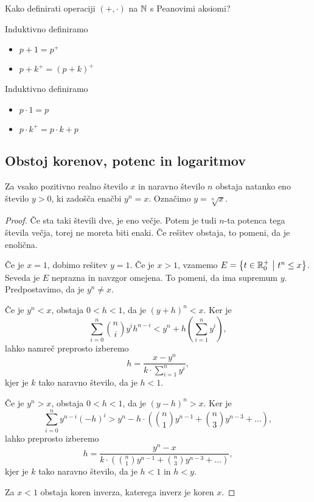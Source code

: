 \documentclass[12pt, a4paper]{article}
\begin{document}
\begin{opomba}
Kako definirati operaciji $(+,\cdot)$ na $\mathbb{N}$ s Peanovimi aksiomi?

\begin{description}[align=right, labelwidth=3cm]
\item[Operacija $+$:] Induktivno definiramo

\begin{itemize}
\item $p+1=p^+$
\item $p+k^+=(p+k)^+$
\end{itemize}

\item[Operacija $\cdot$:] Induktivno definiramo

\begin{itemize}
\item $p\cdot 1=p$
\item $p\cdot k^+=p\cdot k+p$
\end{itemize}
\end{description}
\end{opomba}

\newpage

\subsection{Obstoj korenov, potenc in logaritmov}

\begin{izrek}
Za vsako pozitivno realno število $x$ in naravno število $n$ obstaja natanko eno število $y>0$, ki zadošča enačbi $y^n=x$. Označimo $y=\sqrt[n]{x}$.
\end{izrek}

\begin{proof}
Če sta taki števili dve, je eno večje. Potem je tudi $n$-ta potenca tega števila večja, torej ne moreta biti enaki. Če rešitev obstaja, to pomeni, da je enolična.

Če je $x=1$, dobimo rešitev $y=1$. Če je $x>1$, vzamemo $E=\left\{t\in\mathbb{R}_0^+~\middle\vert~t^n\leq x\right\}$. Seveda je $E$ neprazna in navzgor omejena. To pomeni, da ima supremum $y$. Predpostavimo, da je $y^n\ne x$.

Če je $y^n<x$, obstaja $0<h<1$, da je $(y+h)^n<x$. Ker je
\[
\sum_{i=0}^n\binom{n}{i}y^ih^{n-i}< y^n+h\left(\sum_{i=1}^ny^i\right),
\]
lahko namreč preprosto izberemo
\[
h=\frac{x-y^n}{k\cdot \sum_{i=1}^ny^i},\]
kjer je $k$ tako naravno število, da je $h<1$.

Če je $y^n>x$, obstaja $0<h<1$, da je $(y-h)^n>x$. Ker je
\[
\sum_{i=0}^ny^{n-i}(-h)^i>y^n-h\cdot\left(\binom{n}{1}y^{n-1}+\binom{n}{3}y^{n-3}+\dots\right),
\]
lahko preprosto izberemo
\[
h=\frac{y^n-x}{k\cdot\left(\binom{n}{1}y^{n-1}+\binom{n}{3}y^{n-3}+\dots\right)},
\]
kjer je $k$ tako naravno število, da je $h<1$ in $h<y$.

Za $x<1$ obstaja koren inverza, katerega inverz je koren $x$.
\end{proof}
\end{document}
